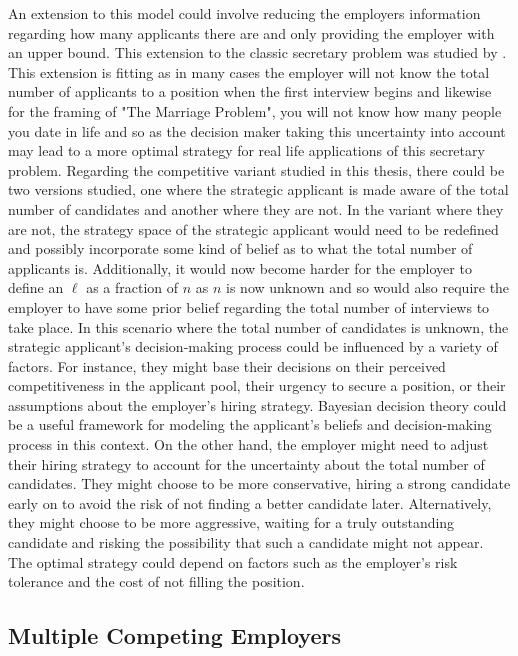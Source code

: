 \documentclass{article}
\begin{document}
An extension to this model could involve reducing the employers information regarding how many applicants there are and only providing the employer with an upper bound. This extension to the classic secretary problem was studied by \cite{freeman1983secretary}. This extension is fitting as in many cases the employer will not know the total number of applicants to a position when the first interview begins and likewise for the framing of "The Marriage Problem", you will not know how many people you date in life and so as the decision maker taking this uncertainty into account may lead to a more optimal strategy for real life applications of this secretary problem. Regarding the competitive variant studied in this thesis, there could be two versions studied, one where the strategic applicant is made aware of the total number of candidates and another where they are not. In the variant where they are not, the strategy space of the strategic applicant would need to be redefined and possibly incorporate some kind of belief as to what the total number of applicants is. Additionally, it would now become harder for the employer to define an $\ell$ as a fraction of $n$ as $n$ is now unknown and so would also require the employer to have some prior belief regarding the total number of interviews to take place. In this scenario where the total number of candidates is unknown, the strategic applicant's decision-making process could be influenced by a variety of factors. For instance, they might base their decisions on their perceived competitiveness in the applicant pool, their urgency to secure a position, or their assumptions about the employer's hiring strategy. Bayesian decision theory could be a useful framework for modeling the applicant's beliefs and decision-making process in this context. On the other hand, the employer might need to adjust their hiring strategy to account for the uncertainty about the total number of candidates. They might choose to be more conservative, hiring a strong candidate early on to avoid the risk of not finding a better candidate later. Alternatively, they might choose to be more aggressive, waiting for a truly outstanding candidate and risking the possibility that such a candidate might not appear. The optimal strategy could depend on factors such as the employer's risk tolerance and the cost of not filling the position.

\subsection{Multiple Competing Employers}
\end{document}

